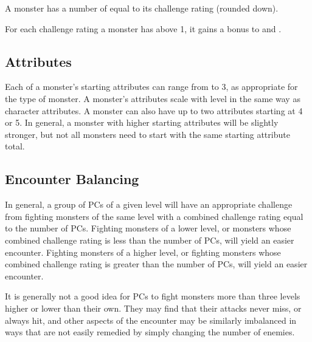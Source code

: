          A monster has a number of  equal to its challenge rating (rounded down).

         For each challenge rating a monster has above 1, it gains a  bonus to  and .

    \subsection{Attributes}
        Each of a monster's starting attributes can range from  to 3, as appropriate for the type of monster.
        A monster's attributes scale with level in the same way as character attributes.
        A monster can also have up to two attributes starting at 4 or 5.
        In general, a monster with higher starting attributes will be slightly stronger, but not all monsters need to start with the same starting attribute total.

    \subsection{Encounter Balancing}\label{Encounter Balancing}
        In general, a group of PCs of a given level will have an appropriate challenge from fighting monsters of the same level with a combined challenge rating equal to the number of PCs.
        Fighting monsters of a lower level, or monsters whose combined challenge rating is less than the number of PCs, will yield an easier encounter.
        Fighting monsters of a higher level, or fighting monsters whose combined challenge rating is greater than the number of PCs, will yield an easier encounter.

        It is generally not a good idea for PCs to fight monsters more than three levels higher or lower than their own.
        They may find that their attacks never miss, or always hit, and other aspects of the encounter may be similarly imbalanced in ways that are not easily remedied by simply changing the number of enemies.


